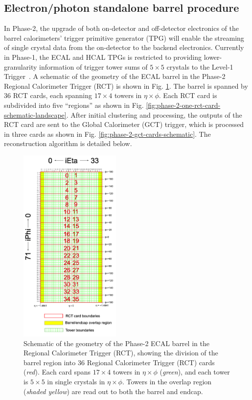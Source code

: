 \subsection{Electron/photon standalone barrel procedure}
In Phase-2, the upgrade of both on-detector and off-detector electronics of the barrel calorimeters' trigger primitive generator (TPG) will enable the streaming of single crystal data from the on-detector to the backend electronics. Currently in Phase-1, the ECAL and HCAL TPGs is restricted to providing lower-granularity information of trigger tower sums of $5 \times 5$ crystals to the Level-1 Trigger~\cite{CMS-TDR-021}. A schematic of the geometry of the ECAL barrel in the Phase-2 Regional Calorimeter Trigger (RCT) is shown in Fig. \ref{fig:phase-2-rct-cards-schematic}. The barrel is spanned by 36 RCT cards, each spanning $17 \times 4$ towers in $\eta \times \phi$. Each RCT card is subdivided into five ``regions'' as shown in Fig. \ref{fig:phase-2-one-rct-card-schematic-landscape}.  After initial clustering and processing, the outputs of the RCT card are sent to the Global Calorimeter (GCT) trigger, which is processed in three cards as shown in Fig. \ref{fig:phase-2-gct-cards-schematic}. The reconstruction algorithm is detailed below.
\begin{figure}[!ht]
    \centering
    \includegraphics[width=5cm]{figures/ch-3-phase2/phase-2-rct-cards-schematic.png}
    \caption{Schematic of the geometry of the Phase-2 ECAL barrel in the Regional Calorimeter Trigger (RCT), showing the division of the barrel region into 36 Regional Calorimeter Trigger (RCT) cards (\textit{red}). Each card spans $17 \times 4$ towers in $\eta \times \phi$ (\textit{green}), and each tower is $5\times 5$ in single crystals in $\eta \times \phi$. Towers in the overlap region (\textit{shaded yellow}) are read out to both the barrel and endcap.}
    \label{fig:phase-2-rct-cards-schematic}
\end{figure}


